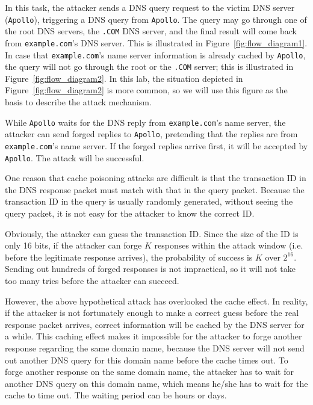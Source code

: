 In this task, the attacker sends a DNS query request to the victim
DNS server ({\tt Apollo}), triggering a DNS query from {\tt Apollo}. The
query may go through one of the root DNS servers, the {\tt .COM} DNS server, and 
the final result will come back from {\tt example.com}'s DNS server. This 
is illustrated in Figure~\ref{fig:flow_diagram1}. In case that 
{\tt example.com}'s name server information is already cached by 
{\tt Apollo}, the query will not go through the root or the 
{\tt .COM} server; this is illustrated in Figure~\ref{fig:flow_diagram2}.
In this lab, the situation depicted in  Figure~\ref{fig:flow_diagram2} is 
more common, so we will use this figure as the basis to describe 
the attack mechanism.

While {\tt Apollo} waits for the DNS reply from {\tt example.com}'s name
server, the attacker can send forged replies to {\tt Apollo}, pretending 
that the replies are from {\tt example.com}'s name server. If the forged 
replies arrive first, it will be accepted by {\tt Apollo}. The attack will
be successful.


One reason that cache poisoning attacks are difficult
is that the transaction ID
in the DNS response packet must match with that 
in the query packet. Because the transaction ID in the query is 
usually randomly generated, without seeing the query packet,
it is not easy for the attacker to know the correct ID.


Obviously, the attacker can guess the transaction ID. Since the
size of the ID is only 16 bits, if the attacker can forge $K$ 
responses within the attack window (i.e. before the legitimate
response arrives), the probability of success is $K$ over $2^{16}$.
Sending out hundreds of forged responses is not impractical, so
it will not take too many tries before the attacker can succeed. 


However, the above hypothetical attack has overlooked the cache effect.
In reality, if the attacker is not fortunately enough to make a correct guess before
the real response packet arrives, correct information will be cached 
by the DNS server for a while. This caching effect makes it impossible
for the attacker to forge another response regarding the same 
domain name, because the DNS server will not send out another DNS query for 
this domain name before the cache times out.
To forge another response on the same domain name, the attacker has to 
wait for another DNS query on this domain name, which means he/she has to
wait for the cache to time out. The waiting period can be hours or days.


